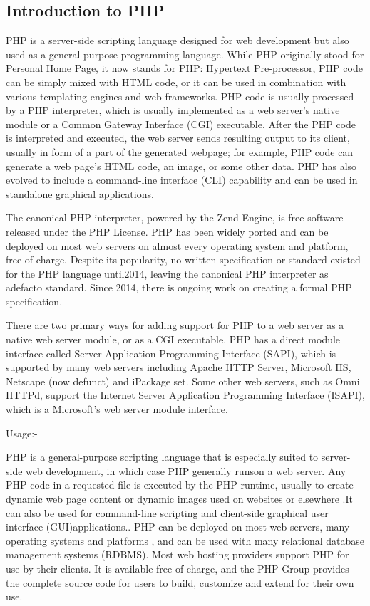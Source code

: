 \documentclass[a4paper,12pt]{article}
\begin{document}
\subsection{Introduction to PHP}\vspace{2mm}
PHP is a server-side scripting language designed for web development but also used as a general-purpose programming language.  While PHP originally stood for Personal Home Page, it now stands for PHP: Hypertext Pre-processor, PHP code can be simply mixed with HTML code, or it can be used in combination with various templating engines and web frameworks. PHP code is usually processed by a PHP interpreter, which is usually implemented as a web server's native module or a Common Gateway Interface (CGI) executable. After the PHP code is interpreted and executed, the web server sends resulting output to its client, usually in form of a part of the generated webpage; for example, PHP code can generate a web page's HTML code, an image, or some other data. PHP has also evolved to include a command-line interface (CLI) capability and can be used in standalone graphical applications.\par\vspace{2mm}
The canonical PHP interpreter, powered by the Zend Engine, is free software released under the PHP License. PHP has been widely ported and can be deployed on most web servers on almost every operating system and platform, free of charge. Despite its popularity, no written specification or standard existed for the PHP language until2014, leaving the canonical PHP interpreter as adefacto standard. Since 2014, there is ongoing work on creating a formal PHP specification.\par\vspace{2mm}
There are two primary ways for adding support for PHP to a web server as a native web server module, or as a CGI executable. PHP has a direct module interface called Server Application Programming Interface (SAPI), which is supported by many web servers including Apache HTTP Server, Microsoft IIS, Netscape (now defunct) and iPackage set. Some other web servers, such as Omni HTTPd, support the Internet Server Application Programming Interface (ISAPI), which is a Microsoft's web server module interface.
\par
Usage:-\par\vspace{2mm}
PHP is a general-purpose scripting language that is especially suited to server-side web development, in which case PHP generally runson a web server. Any PHP code in a requested file is executed by the PHP runtime, usually to create dynamic web page content or dynamic images used on websites or elsewhere .It can also be used for command-line scripting and client-side graphical user interface (GUI)applications.. PHP can be deployed on most web servers, many operating systems and platforms , and can be used with many relational database management systems (RDBMS). Most web hosting providers support PHP for use by their clients. It is available free of charge, and the PHP Group provides the complete source code for users to build, customize and extend for their own use. 
\end{document}
